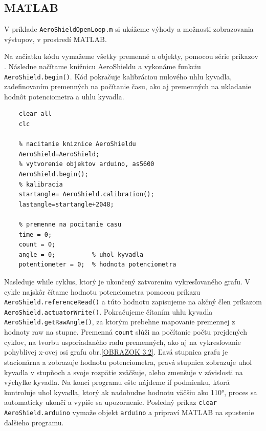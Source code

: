\newpage
\subsection{MATLAB}
\label{MatlabPID}

V príklade \verb|AeroShieldOpenLoop.m| si ukážeme výhody a možnosti zobrazovania výstupov, v prostredí MATLAB. 

Na začiatku kódu vymažeme všetky premenné a objekty, pomocou série príkazov . Následne načítame knižnicu AeroShieldu a vykonáme funkciu \verb|AeroShield.begin()|. Kód pokračuje kalibráciou nulového uhlu kyvadla, zadefinovaním premenných na počítanie času, ako aj premenných na ukladanie hodnôt potenciometra a uhlu kyvadla. 

\begin{lstlisting}[caption={AeroShield open loop inicializacia.},captionpos=b]
	% vymazanie premennych a objektov 
	clear all
	clc 
	
	% nacitanie kniznice AeroShieldu  
	AeroShield=AeroShield;
	% vytvorenie objektov arduino, as5600
	AeroShield.begin();
	% kalibracia
	startangle= AeroShield.calibration(); 
	lastangle=startangle+2048; 
	
	% premenne na pocitanie casu
	time = 0;
	count = 0;
	angle = 0;          % uhol kyvadla
	potentiometer = 0;  % hodnota potenciometra
\end{lstlisting}

Nasleduje while cyklus, ktorý je ukončený zatvorením vykresľovaného grafu. V cykle najskôr čítame hodnotu potenciometra pomocou príkazu \verb|AeroShield.referenceRead()| a túto hodnotu zapisujeme na akčný člen príkazom \verb| AeroShield.actuatorWrite()|. Pokračujeme čítaním uhlu kyvadla \verb|AeroShield.getRawAngle()|, za ktorým prebehne mapovanie premennej z hodnoty raw na stupne. Premenná \verb|count| slúži na počítanie počtu prejdených cyklov, na tvorbu usporiadaného radu premenných, ako aj na vykresľovanie pohyblivej x-ovej osi grafu obr.\ref{OBRAZOK 3.2}. Ľavá stupnica grafu je stacionárna a zobrazuje hodnotu potenciometra, pravá stupnica zobrazuje uhol kyvadla v stupňoch a svoje rozpätie zväčšuje, alebo zmenšuje v závislosti na výchylke kyvadla. Na konci programu ešte nájdeme if podmienku, ktorá kontroluje uhol kyvadla, ktorý ak nadobudne hodnotu väčšiu ako 110°, proces sa automaticky ukončí a vypíše sa upozornenie. Posledný príkaz \verb|clear AeroShield.arduino| vymaže objekt \verb|arduino| a pripraví MATLAB na spustenie ďalšieho programu. 

